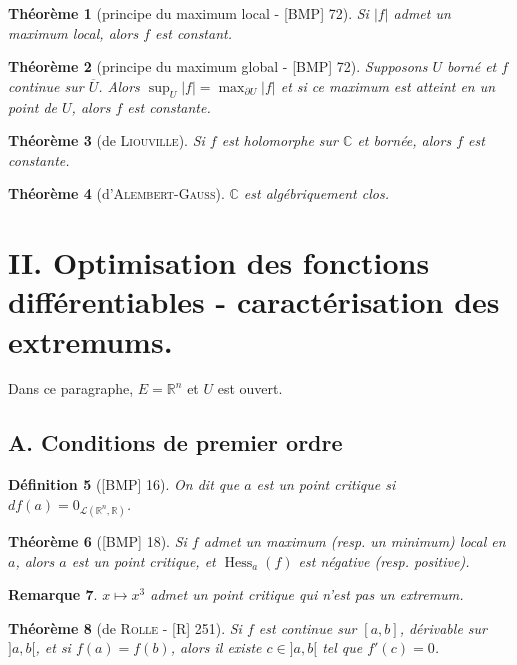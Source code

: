 \documentclass[10pt, a4paper, parskip=full, twoside, twocolumn]{report}
\newtheorem{definition}{Définition}
\newtheorem{theorem}[definition]{Théorème}
\newtheorem{remark}[definition]{Remarque}
\newcommand{\IC}{\mathbb{C}}
\newcommand{\IR}{\mathbb{R}}
\DeclareMathOperator{\Hess}{Hess}
\begin{document}
\begin{theorem}[principe du maximum local - \textnormal{[BMP] 72}]
	Si $\vert f\vert$ admet un maximum local, alors $f$ est constant.
\end{theorem}

\begin{theorem}[principe du maximum global - \textnormal{[BMP] 72}]
	Supposons $U$ borné et $f$ continue sur $\overline{U}$. Alors $\sup_U \vert f\vert = \max_{\partial U} \vert f\vert$
	et si ce maximum est atteint en un point de $U$, alors $f$ est constante.
\end{theorem}

\begin{theorem}[de \textsc{Liouville}]
	Si $f$ est holomorphe sur $\IC$ et bornée, alors $f$ est constante.
\end{theorem}

\begin{theorem}[d'\textsc{Alembert-Gauss}]
	$\IC$ est algébriquement clos.
\end{theorem}

\section*{II. Optimisation des fonctions différentiables - caractérisation des extremums.}
\textcolor{paragraphtext}{Dans ce paragraphe, $E = \IR^n$ et $U$ est ouvert.}

\subsection*{A. Conditions de premier ordre}
\begin{definition}[\textnormal{[BMP] 16}]
	On dit que $a$ est un \emph{point critique} si $df(a) = 0_{\mathcal{L}(\IR^n, \IR)}$.
\end{definition}

\begin{theorem}[\textnormal{[BMP] 18}]
	Si $f$ admet un maximum (resp. un minimum) local en $a$, alors $a$ est un point critique, et $\Hess_a(f)$ est négative (resp. positive).
\end{theorem}

\begin{remark}
	$x\mapsto x^3$ admet un point critique qui n'est pas un extremum.
\end{remark}

\begin{theorem}[de \textsc{Rolle} - \textnormal{[R] 251}]
	Si $f$ est continue sur $[a,b]$, dérivable sur $]a,b[$, et si $f(a) = f(b)$, alors il existe $c\in ]a,b[$ tel que $f'(c) = 0$.
\end{theorem}
\end{document}

